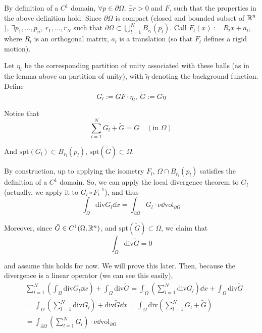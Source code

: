 \documentclass[12pt]{article}
\begin{document}
\begin{proofbox}
    By definition of a $C^1$ domain, $\forall p \in \partial \Omega,\ \exists r > 0$ and $F$, such that the properties in the above definition hold. Since $\partial \Omega$ is compact (closed and bounded subset of $\mathbb{R}^n$), $\exists p_1,\dots,p_n,\ r_1,\dots,r_N$ such that $\partial\Omega \subset \bigcup_{l = 1}^N B_{r_l}(p_l)$. Call $F_l(x) := R_l x + a_l$, where $R_l$ is an orthogonal matrix, $a_l$ is a translation (so that $F_l$ defines a rigid motion).

    Let $\eta_l$ be the corresponding partition of unity associated with these balls (as in the lemma above on partition of unity), with $\tilde\eta$ denoting the background function. Define
    $$
        G_l := GF \cdot \eta_l,\ \tilde G := G \tilde\eta
    $$

    Notice that
    $$
        \sum_{l = 1}^N G_l + \tilde G = G \quad (\text{in } \Omega)
    $$

    And $\mathrm{spt}(G_l) \subset B_{r_l}(p_l)$, $\mathrm{spt}(\tilde G) \subset \Omega$.

    By construction, up to applying the isometry $F_l$, $\Omega \cap B_{r_l}(p_l)$ satisfies the definition of a $C^1$ domain. So, we can apply the local divergence theorem to $G_l$ (actually, we apply it to $G_l \circ F_l^{-1}$), and thus
    $$
        \int_{\Omega} \mathrm{div} G_l \dd x = \int_{\partial \Omega} G_l \cdot \nu \dd \mathrm{vol}_{\partial \Omega}
    $$

    Moreover, since $\tilde G \in C^1(\Omega, \mathbb{R}^n)$, and $\mathrm{spt}(\tilde G) \subset \Omega$, we claim that
    $$
        \int_\Omega \mathrm{div} \tilde G = 0
    $$

    and assume this holds for now. We will prove this later. Then, because the divergence is a linear operator (we can see this easily),
    $$
    \begin{aligned}
        &\sum_{l = 1}^N \left( \int_{\Omega} \mathrm{div} G_l \dd x \right) + \int_\Omega \mathrm{div} \tilde G = \int_{\Omega} \left( \sum_{l = 1}^N \mathrm{div} G_l \right) \dd x  + \int_\Omega \mathrm{div} \tilde G \\
        & = \int_{\Omega} \left( \sum_{l = 1}^N \mathrm{div} G_l \right) + \mathrm{div} \tilde G \dd x = \int_\Omega \mathrm{div}(\sum_{l = 1}^{N} G_l + \tilde G) \\
        &= \int_{\partial \Omega} \left( \sum_{l = 1}^{N} G_l \right) \cdot \nu \dd \mathrm{vol}_{\partial \Omega}
    \end{aligned}
    $$
\end{proofbox}
\end{document}
